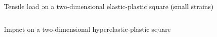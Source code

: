 \begin{frame}{Tensile load on a two-dimensional elastic-plastic square (small strains)}
  \vspace{-0.5cm}
  \begin{block}{}
    \begin{columns}
      \begin{column}{0.5\textwidth}
        
      \end{column}
      \begin{column}{0.5\textwidth}
        
      \end{column}
    \end{columns}
    
  \end{block}
  \vspace{-0.1cm}
  
\end{frame}

\begin{frame}{Impact on a two-dimensional hyperelastic-plastic square}
  \begin{overprint}
    \begin{columns}
      \begin{column}{0.49\textwidth}
        
      \end{column}
      \begin{column}{0.49\textwidth}
        
      \end{column}
    \end{columns}
    \begin{columns}
      \begin{column}{0.49\textwidth}
        
      \end{column}
      \begin{column}{0.49\textwidth}
        
      \end{column}
    \end{columns}
  \end{overprint}
\end{frame}

